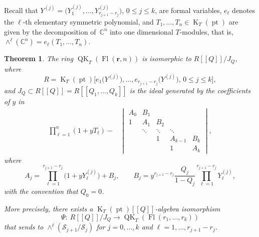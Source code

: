 \documentclass[pdftex]{sigma}
\numberwithin{equation}{section}
\newtheorem{Theorem}{Theorem}[section]
\theoremstyle{definition}
\newcommand{\dbb}[1]{[\![#1]\!]}
\newcommand{\br}[1]{\left(#1\right)}
\DeclareMathOperator{\Fl}{Fl}
\DeclareMathOperator{\QK}{QK}
\DeclareMathOperator{\K}{K}
\DeclareMathOperator{\pt}{pt}
\newcommand{\bfr}{{\mathbf r}}
\newcommand{\C}{{\mathbb C}}
\newcommand{\cS}{{\mathcal S}}
\begin{document}
Recall that $Y^{(j)}=\bigl(Y^{(j)}_1,\dots,
{ Y^{(j)}_{r_{j+1}-r_j}}\bigr)$, $0\leq j\leq k$, are formal variables, $e_\ell$ denotes the $\ell$-th elementary symmetric polynomial, and $T_1,\dots, T_n \in \K_T(\pt)$ are given by
the decomposition of~$\C^n$ into one dimensional $T$-modules, that is, $\wedge^\ell(\C^n)=e_\ell(T_1,\dots,T_n)$.

\begin{Theorem}\label{thm:main}
 The ring $\QK_T(\Fl(\bfr,n))$ is isomorphic to $R\dbb{Q}/J_Q$, where
 \[
 R=\K_T(\pt)\bigl[e_1\bigl(Y^{(j)}\bigr),\dots,e_{r_{j+1}-r_j}\bigl(Y^{(j)}\bigr),\, 0\leq j\leq k\bigr],
 \]
 and $J_Q\subset R[\![Q]\!]=R[\![Q_1,\dots,Q_k]\!]$
is the ideal generated by the coefficients of $y$ in
\begin{align}\label{eqn:whit-short-gen}
 \prod_{\ell=1}^{n}(1+yT_\ell)-
 &\begin{vmatrix}
 A_0 & B_1 & & & \\
 1 & A_1 & B_2 & & \\ & \ddots & \ddots & \ddots & \\ & & 1 & A_{k-1} & B_{k}\\ & & & 1 & A_{k}
 \end{vmatrix},
 \end{align}
 where
 \[
 A_j=\prod_{\ell=1}^{r_{j+1}-r_j}\bigl(1+y Y^{(j)}_\ell\bigr)+B_j,\qquad B_j=y^{{r_{j+1}-r_j}}\frac{Q_j}{1-Q_j}\prod_{\ell=1}^{r_{j+1}-r_j}Y^{(j)}_\ell,
 \]
 with the convention that $Q_0=0$.

 More precisely,
there exists a $\K_T(\pt)[\![Q]\!]$-algebra isomorphism
\[
\Psi\colon\ R[\![Q]\!]/J_Q \to \QK_T(\Fl(r_1,\dots,r_k))
\]
that sends  to $\wedge^\ell\br{\cS_{j+1}/\cS_j}$ for $j=0,\dots,k$ and $\ell=1,\dots,r_{j+1}-r_{j}$.
\end{Theorem}
\end{document}

